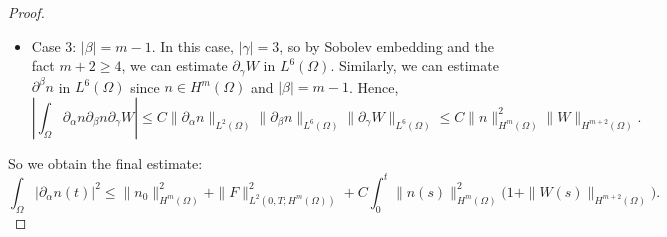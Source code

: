 \documentclass[12pt]{article}
\theoremstyle{plain}
\begin{document}
\begin{proof}
\begin{itemize}
        \begin{equation*}
        \left|\int_{\Omega} \partial_{\alpha} n \partial_{\beta} n \partial_{\gamma} W\right| \le \|\partial_{\alpha}n\|_{L^{2}(\Omega)} \|\partial_{\beta}n\|_{L^{2}(\Omega)} \|\partial_{\gamma} W\|_{L^{\infty}(\Omega)} \le C\|n\|_{H^{m}(\Omega)}^{2} \|W\|_{H^{m + 2}(\Omega)}. 
        \end{equation*}
        \item Case 3: $|\beta| = m - 1$. In this case, $|\gamma| = 3$, so by Sobolev embedding and the fact $m + 2 \ge 4$, we can estimate $\partial_{\gamma}W$ in $L^{6}(\Omega)$. Similarly, we can estimate $\partial^{\beta} n$ in $L^{6}(\Omega)$ since $n \in H^{m}(\Omega)$ and $|\beta| = m - 1$. Hence,
        \begin{equation*}
        \left|\int_{\Omega} \partial_{\alpha} n \partial_{\beta} n \partial_{\gamma} W\right| \le C\|\partial_{\alpha}n\|_{L^{2}(\Omega)} \|\partial_{\beta}n\|_{L^{6}(\Omega)} \|\partial_{\gamma}W\|_{L^{6}(\Omega)} \le C\|n\|^{2}_{H^{m}(\Omega)} \|W\|_{H^{m + 2}(\Omega)}.
        \end{equation*}
    \end{itemize}
    So we obtain the final estimate:
    \begin{equation}\label{mdiffineq}
    \int_{\Omega} |\partial_{\alpha} n(t)|^{2} \le \|n_{0}\|_{H^{m}(\Omega)}^{2} + \|F\|_{L^{2}(0, T; H^{m}(\Omega))}^{2} + C\int_{0}^{t} \|n(s)\|^{2}_{H^{m}(\Omega)} \Big(1 + \|W(s)\|_{H^{m + 2}(\Omega)}\Big).
    \end{equation}

\medskip


\end{proof}
\end{document}
